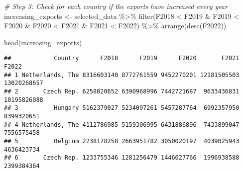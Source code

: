 \documentclass[
]{article}
\newenvironment{Shaded}{\begin{snugshade}}{\end{snugshade}}
\newcommand{\CommentTok}[1]{\textcolor[rgb]{0.56,0.35,0.01}{\textit{#1}}}
\newcommand{\FunctionTok}[1]{\textcolor[rgb]{0.00,0.00,0.00}{#1}}
\newcommand{\NormalTok}[1]{#1}
\newcommand{\OtherTok}[1]{\textcolor[rgb]{0.56,0.35,0.01}{#1}}
\newcommand{\SpecialCharTok}[1]{\textcolor[rgb]{0.00,0.00,0.00}{#1}}
\begin{document}
\begin{Shaded}
\begin{Highlighting}[]
\CommentTok{\# Step 3: Check for each country if the exports have increased every year}
\NormalTok{increasing\_exports }\OtherTok{\textless{}{-}}\NormalTok{ selected\_data }\SpecialCharTok{\%\textgreater{}\%}
  \FunctionTok{filter}\NormalTok{(F2018 }\SpecialCharTok{\textless{}}\NormalTok{ F2019 }\SpecialCharTok{\&}\NormalTok{ F2019 }\SpecialCharTok{\textless{}}\NormalTok{ F2020 }\SpecialCharTok{\&}\NormalTok{ F2020 }\SpecialCharTok{\textless{}}\NormalTok{ F2021 }\SpecialCharTok{\&}\NormalTok{ F2021 }\SpecialCharTok{\textless{}}\NormalTok{ F2022) }\SpecialCharTok{\%\textgreater{}\%}
  \FunctionTok{arrange}\NormalTok{(}\FunctionTok{desc}\NormalTok{(F2022))}
\end{Highlighting}
\end{Shaded}

\begin{Shaded}
\begin{Highlighting}[]
\FunctionTok{head}\NormalTok{(increasing\_exports)}
\end{Highlighting}
\end{Shaded}

\begin{verbatim}
##            Country      F2018      F2019      F2020       F2021       F2022
## 1 Netherlands, The 8316603140 8772761559 9452270201 12181505503 13020268657
## 2       Czech Rep. 6258020652 6390968996 7442721687  9633436831 10195826088
## 3          Hungary 5162379027 5234097261 5457287764  6992357950  8399320651
## 4 Netherlands, The 4112786985 5159306995 6431886896  7433899047  7556575458
## 5          Belgium 2238178258 2663951782 3050020197  4039025943  4636423734
## 6       Czech Rep. 1233755346 1281256479 1446627766  1996938588  2399384384
\end{verbatim}
\end{document}
